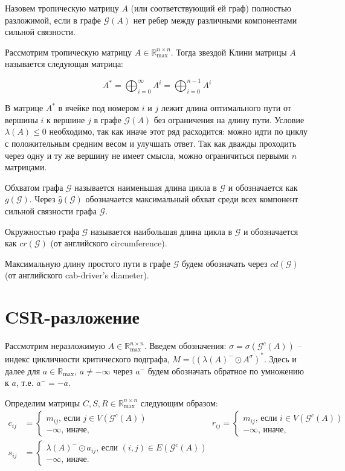 \documentclass[12pt]{article}
\begin{document}
Назовем тропическую матрицу $A$ (или соответствующий ей граф) полностью разложимой, если в графе $\mathcal{G}(A)$ нет ребер между различными компонентами сильной связности.

Рассмотрим тропическую матрицу $A \in \mathbb{R}_{\max}^{n \times n}$. Тогда звездой Клини матрицы $A$ называется следующая матрица:

\begin{equation*}
    A^* = \bigoplus_{i = 0}^{\infty} A^i =  \bigoplus_{i = 0}^{n - 1} A^i
\end{equation*}

В матрице $A^*$ в ячейке под номером $i$ и $j$ лежит длина оптимального пути от вершины $i$ к вершине $j$ в графе $\mathcal{G}(A)$ без ограничения на длину пути. Условие $\lambda(A) \le 0$ необходимо, так как иначе этот ряд расходится: можно идти по циклу с положительным средним весом и улучшать ответ. Так как дважды проходить через одну и ту же вершину не имеет смысла, можно ограничиться первыми $n$ матрицами.

Обхватом графа $\mathcal{G}$ называется наименьшая длина цикла в $\mathcal{G}$ и обозначается как $g(\mathcal{G})$. Через $\hat{g}(\mathcal{G})$ обозначается максимальный обхват среди всех компонент сильной связности графа $\mathcal{G}$.

Окружностью графа $\mathcal{G}$ называется наибольшая длина цикла в $\mathcal{G}$ и обозначается как $cr(\mathcal{G})$ (от английского circumference).

Максимальную длину простого пути в графе $\mathcal{G}$ будем обозначать через $cd(\mathcal{G})$ (от английского cab-driver's diameter).

\section{CSR-разложение}
\label{subsection:CSR}
Рассмотрим неразложимую $A \in \mathbb{R}_{\max}^{n \times n}$. Введем обозначения: $\sigma = \sigma(\mathcal{G}^c(A))$ -- индекс цикличности критического подграфа, $M = ((\lambda(A)^-\odot A^\sigma)^*$. Здесь и далее для $a \in \mathbb{R}_{\max}$, $a \ne -\infty$ через $a^-$ будем обозначать обратное по умножению к $a$, т.е. $a^- = -a$.

Определим матрицы $C, S, R \in \mathbb{R}_{\max}^{n \times n}$ следующим образом:
\begin{align*}
    c_{ij} &= \begin{cases}
        m_{ij}\text{, если } j \in V(\mathcal{G}^c(A)) \\
        -\infty \text{, иначе,}
    \end{cases}
    &
    r_{ij} = \begin{cases}
        m_{ij}\text{, если } i \in V(\mathcal{G}^c(A)) \\
        -\infty \text{, иначе,}
    \end{cases}
    \\
    s_{ij} &= \begin{cases}
        \lambda(A)^- \odot a_{ij}\text{, если } (i, j) \in E(\mathcal{G}^c(A)) \\
        -\infty \text{, иначе.}
    \end{cases}
\end{align*}
\end{document}
